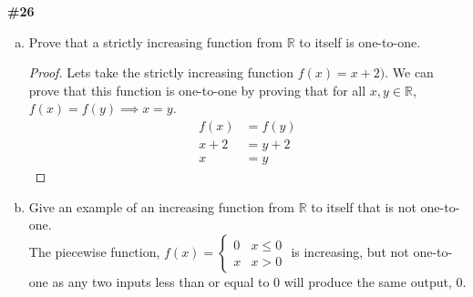 \documentclass{article}
\newcommand{\problem}[1]{\textbf{\##1}}
\newcommand{\prob}[1]{\problem{#1}}
\newcommand{\AllReals}{\mathbb{R}}
\begin{document}
\pagebreak
\prob{26}
\begin{enumerate}[a)]
    \item Prove that a strictly increasing function from \(\AllReals\) to itself is one-to-one.
    \begin{proof}
        Lets take the strictly increasing function \(f(x) = x + 2)\). We can prove that this function is one-to-one by proving that for all \(x, y \in \AllReals\), \(f(x) = f(y) \implies x = y\).
        \begin{align*}
            f(x) &= f(y)\\
            x + 2 &= y + 2\\
            x &= y
        \end{align*}
    \end{proof}
    \item Give an example of an increasing function from \(\AllReals\) to itself that is not one-to-one.\\
    The piecewise function, \(f(x) = \begin{cases} 
        0 & x\leq 0 \\
        x & x>0
     \end{cases}\) is increasing, but not one-to-one as any two inputs less than or equal to 0 will produce the same output, 0.
\end{enumerate}
\end{document}
